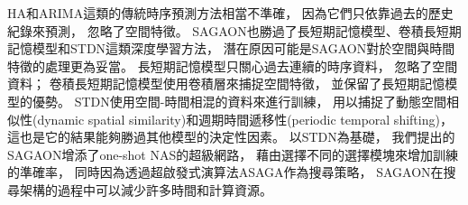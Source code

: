 \documentclass[a4paper,12pt]{extarticle}
\begin{document}
                HA和ARIMA這類的傳統時序預測方法相當不準確，
                因為它們只依靠過去的歷史紀錄來預測，
                忽略了空間特徵。
                SAGAON也勝過了長短期記憶模型、卷積長短期記憶模型和STDN這類深度學習方法，
                潛在原因可能是SAGAON對於空間與時間特徵的處理更為妥當。
                長短期記憶模型只關心過去連續的時序資料，
                忽略了空間資料；
                卷積長短期記憶模型使用卷積層來捕捉空間特徵，
                並保留了長短期記憶模型的優勢。
                STDN使用空間-時間相混的資料來進行訓練，
                用以捕捉了動態空間相似性(dynamic spatial similarity)和週期時間遞移性(periodic temporal shifting)，
                這也是它的結果能夠勝過其他模型的決定性因素。
                以STDN為基礎，
                我們提出的SAGAON增添了one-shot NAS的超級網路，
                藉由選擇不同的選擇模塊來增加訓練的準確率，
                同時因為透過超啟發式演算法ASAGA作為搜尋策略，
                SAGAON在搜尋架構的過程中可以減少許多時間和計算資源。
\end{document}
